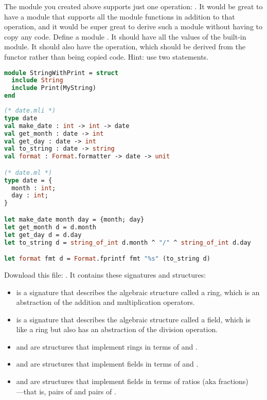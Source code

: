 The  module you created above supports just one operation: . It would be great to have a module that supports all the  module functions in addition to that  operation, and it would be super great to derive such a module without having to copy any code.
Define a module . It should have all the values of the built-in  module. It should also have the  operation, which should be derived from the  functor rather than being copied code. Hint: use two  statements.

\begin{lstlisting}[language=OCaml]
module StringWithPrint = struct
  include String
  include Print(MyString)
end
\end{lstlisting}

\problem[date]
\begin{lstlisting}[language=OCaml]
(* date.mli *)
type date
val make_date : int -> int -> date
val get_month : date -> int
val get_day : date -> int
val to_string : date -> string
val format : Format.formatter -> date -> unit

(* date.ml *)
type date = {
  month : int;
  day : int;
}

let make_date month day = {month; day}
let get_month d = d.month
let get_day d = d.day
let to_string d = string_of_int d.month ^ "/" ^ string_of_int d.day

let format fmt d = Format.fprintf fmt "%s" (to_string d)
\end{lstlisting}

Download this file: . It contains these signatures and structures:
\begin{itemize}
  \item {} is a signature that describes the algebraic structure called a ring, which is an abstraction of the addition and multiplication operators.
  \item {} is a signature that describes the algebraic structure called a field, which is like a ring but also has an abstraction of the division operation.
  \item {} and  are structures that implement rings in terms of  and .
  \item {} and  are structures that implement fields in terms of  and .
  \item {} and  are structures that implement fields in terms of ratios (aka fractions)\\---that is, pairs of  and pairs of .
\end{itemize}

